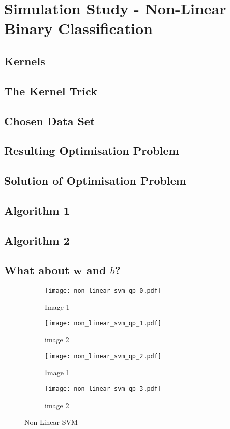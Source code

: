\documentclass[10pt, a4paper,reqno]{amsart}
\begin{document}
\clearpage\section{Simulation Study - Non-Linear Binary Classification}


\subsection{Kernels}


\subsection{The Kernel Trick}


\subsection{Chosen Data Set}


\subsection{Resulting Optimisation Problem}


\subsection{Solution of Optimisation Problem}


\subsection{Algorithm 1}


\subsection{Algorithm 2}


\subsection{What about $\mathbf{w}$ and $b$?}


\begin{figure}[H]
	\centering	
	\begin{subfigure}{0.5\textwidth}
		\centering
		\texttt{[image: non\_linear\_svm\_qp\_0.pdf]}
		\caption{Image 1}
	\end{subfigure}%
	\begin{subfigure}{0.5\textwidth}
		\centering
		\texttt{[image: non\_linear\_svm\_qp\_1.pdf]}
		\caption{image 2}
	\end{subfigure}
	\begin{subfigure}{0.5\textwidth}
		\centering
		\texttt{[image: non\_linear\_svm\_qp\_2.pdf]}
		\caption{Image 1}
	\end{subfigure}%
	\begin{subfigure}{0.5\textwidth}
		\centering
		\texttt{[image: non\_linear\_svm\_qp\_3.pdf]}
		\caption{image 2}
	\end{subfigure}
	\caption{Non-Linear SVM}
\end{figure}
\end{document}
